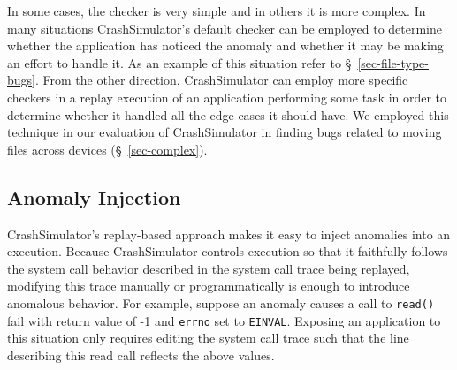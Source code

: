     In some cases, %
    the checker is very simple and in others it is more complex.
   In many situations
    CrashSimulator's default checker can be employed to determine
    whether the application has noticed the anomaly and whether it may be making
    an effort to handle it.  As an example of this situation refer to
    \S~\ref{sec-file-type-bugs}.  From the other direction,
    CrashSimulator can employ more specific checkers in a replay execution of an
    application performing some task in order to determine whether it handled
    all the edge cases it should have.  We employed this technique in our
    evaluation of CrashSimulator in finding bugs related to moving files across
    devices (\S~\ref{sec-complex}).
    
    \subsection{Anomaly Injection}

    CrashSimulator's replay-based approach makes it easy to inject anomalies
    into an execution.  
    Because CrashSimulator controls execution so that it faithfully
    follows the system call behavior described in the system call trace being
    replayed, modifying this trace manually or programmatically is enough to
    introduce anomalous behavior.  For example, suppose an anomaly causes a
    call to {\tt read()} fail with return value of -1 and {\tt errno} set to
    {\tt EINVAL}.  Exposing an application to this situation only requires
    editing the system call trace such that the line describing this read call
    reflects the above values.




